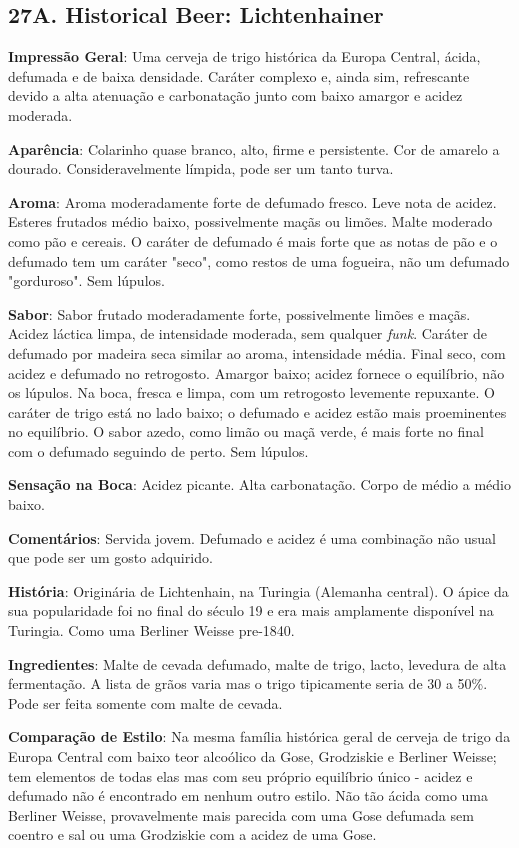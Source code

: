 \subsection*{27A. Historical Beer: Lichtenhainer}
\textbf{Impressão Geral}: Uma cerveja de trigo histórica da Europa Central, ácida, defumada e de baixa densidade. Caráter complexo e, ainda sim, refrescante devido a alta atenuação e carbonatação junto com baixo amargor e acidez moderada.

\textbf{Aparência}: Colarinho quase branco, alto, firme e persistente. Cor de amarelo a dourado. Consideravelmente límpida, pode ser um tanto turva.

\textbf{Aroma}: Aroma moderadamente forte de defumado fresco. Leve nota de acidez. Esteres frutados médio baixo, possivelmente maçãs ou limões. Malte moderado como pão e cereais. O caráter de defumado é mais forte que as notas de pão e o defumado tem um caráter "seco", como restos de uma fogueira, não um defumado "gorduroso". Sem lúpulos.

\textbf{Sabor}: Sabor frutado moderadamente forte, possivelmente limões e maçãs. Acidez láctica limpa, de intensidade moderada, sem qualquer \textit{funk}. Caráter de defumado por madeira seca similar ao aroma, intensidade média. Final seco, com acidez e defumado no retrogosto. Amargor baixo; acidez fornece o equilíbrio, não os lúpulos. Na boca, fresca e limpa, com um retrogosto levemente repuxante. O caráter de trigo está no lado baixo; o defumado e acidez estão mais proeminentes no equilíbrio. O sabor azedo, como limão ou maçã verde, é mais forte no final com o defumado seguindo de perto. Sem lúpulos.

\textbf{Sensação na Boca}: Acidez picante. Alta carbonatação. Corpo de médio a médio baixo.

\textbf{Comentários}: Servida jovem. Defumado e acidez é uma combinação não usual que pode ser um gosto adquirido.

\textbf{História}: Originária de Lichtenhain, na Turingia (Alemanha central). O ápice da sua popularidade foi no final do século 19 e era mais amplamente disponível na Turingia. Como uma Berliner Weisse pre-1840.

\textbf{Ingredientes}: Malte de cevada defumado, malte de trigo, lacto, levedura de alta fermentação. A lista de grãos varia mas o trigo tipicamente seria de 30 a 50\%. Pode ser feita somente com malte de cevada.

\textbf{Comparação de Estilo}: Na mesma família histórica geral de cerveja de trigo da Europa Central com baixo teor alcoólico da Gose, Grodziskie e Berliner Weisse; tem elementos de todas elas mas com seu próprio equilíbrio único - acidez e defumado não é encontrado em nenhum outro estilo. Não tão ácida como uma Berliner Weisse, provavelmente mais parecida com uma Gose defumada sem coentro e sal ou uma Grodziskie com a acidez de uma Gose.

